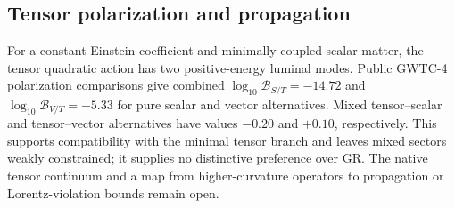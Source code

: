 \subsection{Tensor polarization and propagation}
\label{sec:tensor}
For a constant Einstein coefficient and minimally coupled scalar matter,
the tensor quadratic action has two positive-energy luminal modes.
Public GWTC-4 polarization comparisons give combined
$\log_{10}\mathcal B_{S/T}=-14.72$ and
$\log_{10}\mathcal B_{V/T}=-5.33$ for pure scalar and vector
alternatives. Mixed tensor--scalar and tensor--vector alternatives
have values $-0.20$ and $+0.10$, respectively. This supports
compatibility with the minimal tensor branch and leaves mixed sectors
weakly constrained; it supplies no distinctive preference over GR.
The native tensor continuum and a map from higher-curvature operators
to propagation or Lorentz-violation bounds remain open.
\cite{gwtcnew}

